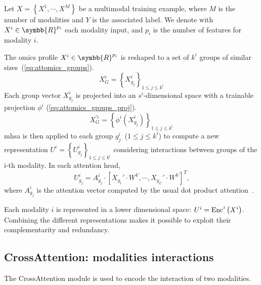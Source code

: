 \documentclass[../main.tex]{subfiles}
\begin{document}
	  Let \( X = \left\{X^{1}, \cdots, X^{M} \right\} \) be a multimodal training example, where \(M\) is the number of modalities and \(Y\) is the associated label.
	  We denote with \(X^{i} \in \symbb{R}^{p_i}\) each modality input, and \(p_i\) is the number of features for modality \(i\).

	  The omics profile \(X^{i} \in \symbb{R}^{p_i} \) is reshaped to a set of \(k^i\) groups of similar sizes~(\cref{eq:attomics_groups}).
	  \begin{equation}
	    X^{i}_{G} = \left\{X^{i}_{g_j} \right\}_{1\leq j\leq k^i}\label{eq:attomics_groups}
	  \end{equation}
	  Each group vector \(X^{i}_{g_j}\) is projected into an \(s^i\)-dimensional space with a trainable projection \(\phi^i\) (\cref{eq:attomics_groups_proj}).
	  \begin{equation}
	    X^{'i}_{G} = \left\{\phi^i\left(X^{i}_{g_j} \right) \right\}_{1\leq j\leq k^i}\label{eq:attomics_groups_proj}
	  \end{equation}
	  \Gls{mhsa} is then applied to each group \(g^i_j\)~(\(1 \leq j \leq k^i \)) to compute a new representation \({U^i = \left\{ U^i_{g_j}\right\}_{1 \leq j \leq k^i}}\) considering interactions between groups of the i-th modality.
	  In each attention head,
	  \begin{equation}
	    U^{i}_{g_j} = A^{i}_{g_j} \cdot \left[ X_{g_1}' \cdot W^V, \cdots ,  X_{g_{k^i}}' \cdot W^V\right]^T \text{,}\label{eq:enc_mhsa}
	  \end{equation}
	  where \(A^{i}_{g_j}\) is the attention vector computed by the usual dot product attention~\cite{AttentionAllYouNeed}.

	  Each modality \(i\) is represented in a lower dimensional space: \(U^{i} = \operatorname{Enc}^{i}\left(X^{i}\right)\). %
	  Combining the different representations makes it possible to exploit their complementarity and redundancy.

	\subsection{CrossAttention: modalities interactions}
	  The CrossAttention module is used to encode the interaction of two modalities.
\end{document}
